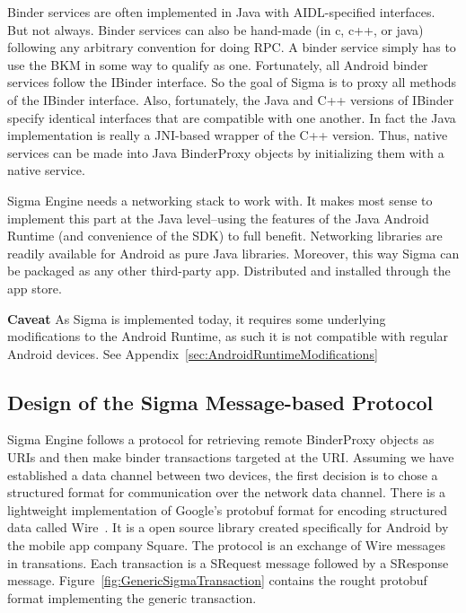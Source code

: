 \documentclass[prodmode]{acmlarge}
\begin{document}
Binder services are often implemented in Java with AIDL-specified interfaces. But not always. Binder services can also be hand-made (in c, c++, or java) following any arbitrary convention for doing RPC. A binder service simply has to use the BKM in some way to qualify as one. Fortunately, all Android binder services follow the IBinder interface. So the goal of Sigma is to proxy all methods of the IBinder interface. Also, fortunately, the Java and C++ versions of IBinder specify identical interfaces that are compatible with one another. In fact the Java implementation is really a JNI-based wrapper of the C++ version. Thus, native services can be made into Java BinderProxy objects by initializing them with a native service.

Sigma Engine needs a networking stack to work with. It makes most sense to implement this part at the Java level--using the features of the Java Android Runtime (and convenience of the SDK) to full benefit. Networking libraries are readily available for Android as pure Java libraries. Moreover, this way Sigma can be packaged as any other third-party app. Distributed and installed through the app store.

\textbf{Caveat} As Sigma is implemented today, it requires some underlying modifications to the Android Runtime, as such it is not compatible with regular Android devices. See Appendix~\ref{sec:AndroidRuntimeModifications}

\subsection{Design of the Sigma Message-based Protocol}
Sigma Engine follows a protocol for retrieving remote BinderProxy objects as URIs and then make binder transactions targeted at the URI. Assuming we have established a data channel between two devices, the first decision is to chose a structured format for communication over the network data channel. There is a lightweight implementation of Google's protobuf format for encoding structured data called Wire~\cite{Wire,IntroWire}. It is a open source library created specifically for Android by the mobile app company Square. The protocol is an exchange of Wire messages in transations. Each transaction is a SRequest message followed by a SResponse message. Figure~\ref{fig:GenericSigmaTransaction} contains the rought protobuf format implementing the generic transaction.
\end{document}
